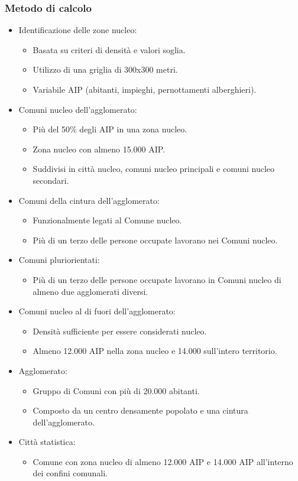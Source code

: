 \documentclass{article}
\begin{document}
\subsubsection{Metodo di calcolo}
\begin{itemize}
    \item Identificazione delle zone nucleo:
    \begin{itemize}
        \item Basata su criteri di densità e valori soglia.
        \item Utilizzo di una griglia di 300x300 metri.
        \item Variabile AIP (abitanti, impieghi, pernottamenti alberghieri).
    \end{itemize}
    \item Comuni nucleo dell’agglomerato:
    \begin{itemize}
        \item Più del 50\% degli AIP in una zona nucleo.
        \item Zona nucleo con almeno 15.000 AIP.
        \item Suddivisi in città nucleo, comuni nucleo principali e comuni nucleo secondari.
    \end{itemize}
    \item Comuni della cintura dell’agglomerato:
    \begin{itemize}
        \item Funzionalmente legati al Comune nucleo.
        \item Più di un terzo delle persone occupate lavorano nei Comuni nucleo.
    \end{itemize}
    \item Comuni pluriorientati:
    \begin{itemize}
        \item Più di un terzo delle persone occupate lavorano in Comuni nucleo di almeno due
            agglomerati diversi.
    \end{itemize}
    \item Comuni nucleo al di fuori dell’agglomerato:
    \begin{itemize}
        \item Densità sufficiente per essere considerati nucleo.
        \item Almeno 12.000 AIP nella zona nucleo e 14.000 sull’intero territorio.
    \end{itemize}
    \item Agglomerato:
    \begin{itemize}
        \item Gruppo di Comuni con più di 20.000 abitanti.
        \item Composto da un centro densamente popolato e una cintura dell’agglomerato.
    \end{itemize}
    \item Città statistica:
    \begin{itemize}
        \item Comune con zona nucleo di almeno 12.000 AIP e 14.000 AIP all’interno dei confini
            comunali.
    \end{itemize}
\end{itemize}
\end{document}
